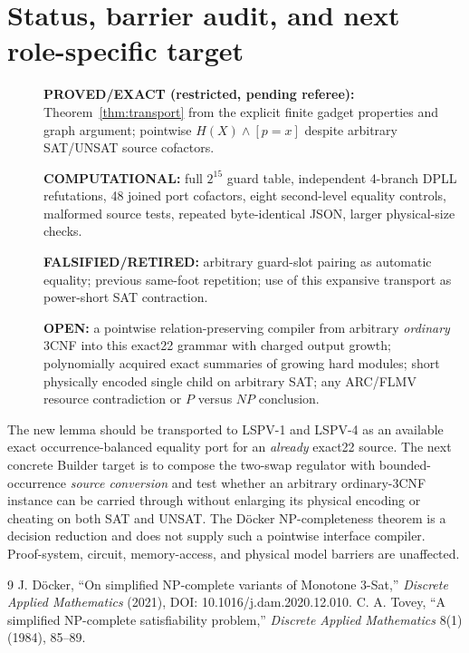\documentclass[11pt]{article}
\begin{document}
\section{Status, barrier audit, and next role-specific target}
\begin{description}
\item[]\textbf{PROVED/EXACT (restricted, pending referee):} Theorem~\ref{thm:transport} from the explicit finite gadget properties and graph argument; pointwise $H(X)\wedge[p=x]$ despite arbitrary SAT/UNSAT source cofactors.
\item[]\textbf{COMPUTATIONAL:} full $2^{15}$ guard table, independent 4-branch DPLL refutations, 48 joined port cofactors, eight second-level equality controls, malformed source tests, repeated byte-identical JSON, larger physical-size checks.
\item[]\textbf{FALSIFIED/RETIRED:} arbitrary guard-slot pairing as automatic equality; previous same-foot repetition; use of this expansive transport as power-short SAT contraction.
\item[]\textbf{OPEN:} a pointwise relation-preserving compiler from arbitrary \emph{ordinary} 3CNF into this exact22 grammar with charged output growth; polynomially acquired exact summaries of growing hard modules; short physically encoded single child on arbitrary SAT; any ARC/FLMV resource contradiction or $P$ versus $NP$ conclusion.
\end{description}
The new lemma should be transported to LSPV-1 and LSPV-4 as an available exact occurrence-balanced equality port for an \emph{already} exact22 source. The next concrete Builder target is to compose the two-swap regulator with bounded-occurrence \emph{source conversion} and test whether an arbitrary ordinary-3CNF instance can be carried through without enlarging its physical encoding or cheating on both SAT and UNSAT. The D\"ocker NP-completeness theorem is a decision reduction and does not supply such a pointwise interface compiler. Proof-system, circuit, memory-access, and physical model barriers are unaffected.

\begin{thebibliography}{9}
 J. D\"ocker, ``On simplified NP-complete variants of Monotone 3-Sat,'' \emph{Discrete Applied Mathematics} (2021), DOI: 10.1016/j.dam.2020.12.010.
 C. A. Tovey, ``A simplified NP-complete satisfiability problem,'' \emph{Discrete Applied Mathematics} 8(1) (1984), 85--89.
\end{thebibliography}
\end{document}
